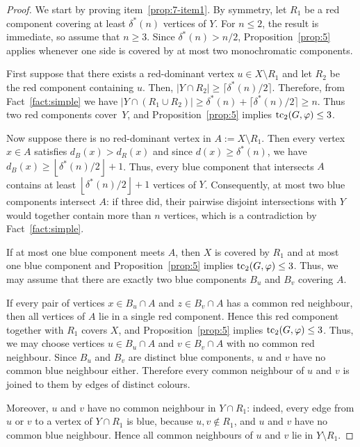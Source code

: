 \documentclass[10pt,a4paper]{amsart}
\def\tc{\mathop{\text{\rm tc}}\nolimits}
\begin{document}
\begin{proof}
We start by proving item~\ref{prop:7-item1}. By symmetry, let $R_1$ be a red component
covering at least $\delta^*(n)$ vertices of $Y$. For $n\le 2$, the result is
immediate, so assume that $n\ge 3$. Since $\delta^*(n)>n/2$,
Proposition~\ref{prop:5} applies whenever one side is covered by at most two
monochromatic components.

First suppose that there exists a red-dominant vertex $u \in X \setminus
R_1$ and let $R_2$ be the red component containing $u$. Then, $|Y\cap R_2| \ge
\lceil\delta^*(n)/2\rceil$. Therefore, from Fact~\ref{fact:simple} we have
$|Y\cap(R_1\cup R_2)|\ge\delta^*(n)+\lceil\delta^*(n)/2\rceil\ge n$.
Thus two red components cover~$Y$, and Proposition~\ref{prop:5} implies
$\tc_2(G,\varphi) \le 3$.

Now suppose there is no red-dominant vertex in $A:=X\setminus R_1$. Then
every vertex $x\in A$ satisfies $d_B(x)>d_R(x)$ and since $d(x)\ge \delta^*(n)$,
we have $d_B(x)\ge \left\lfloor \delta^*(n)/2\right\rfloor+1$. Thus, every
blue component that intersects $A$ contains at least
$\left\lfloor\delta^*(n)/2\right\rfloor+1$ vertices of $Y$. Consequently, at
most two blue components intersect $A$: if three did, their pairwise disjoint
intersections with $Y$ would together contain more than $n$ vertices, which is a contradiction by Fact~\ref{fact:simple}.

If at most one blue component meets $A$, then $X$ is covered by $R_1$ and at
most one blue component and Proposition~\ref{prop:5} implies
$\tc_2(G,\varphi)\le 3$. Thus, we may assume that there are exactly two blue
components $B_u$ and $B_v$ covering $A$.

If every pair of vertices $x\in B_u\cap A$ and $z\in B_v\cap A$ has a common red
neighbour, then all vertices of $A$ lie in a single red component. Hence this
red component together with $R_1$ covers $X$, and Proposition~\ref{prop:5}
implies $\tc_2(G,\varphi)\le 3$. Thus, we may choose vertices $u\in B_u\cap A$ and $v\in
B_v\cap A$ with no common red neighbour. Since $B_u$ and $B_v$ are distinct blue
components, $u$ and $v$ have no common blue neighbour either. Therefore every
common neighbour of $u$ and $v$ is joined to them by edges of distinct colours.

Moreover, $u$ and $v$ have no common neighbour in $Y\cap R_1$: indeed, every
edge from $u$ or $v$ to a vertex of $Y\cap R_1$ is blue, because
$u,v\notin R_1$, and $u$ and $v$ have no common blue neighbour. Hence all
common neighbours of $u$ and $v$ lie in $Y\setminus R_1$.


\end{proof}
\end{document}
